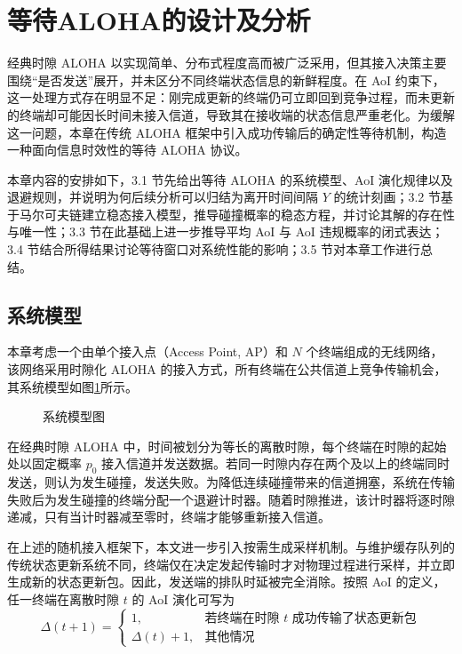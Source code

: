 \clearpage

\vspace*{-1\baselineskip}
\section{等待ALOHA的设计及分析}
\vspace{6pt}

经典时隙 ALOHA 以实现简单、分布式程度高而被广泛采用，但其接入决策主要围绕“是否发送”展开，并未区分不同终端状态信息的新鲜程度。在 AoI 约束下，这一处理方式存在明显不足：刚完成更新的终端仍可立即回到竞争过程，而未更新的终端却可能因长时间未接入信道，导致其在接收端的状态信息严重老化。为缓解这一问题，本章在传统 ALOHA 框架中引入成功传输后的确定性等待机制，构造一种面向信息时效性的等待 ALOHA 协议。

本章内容的安排如下，3.1 节先给出等待 ALOHA 的系统模型、AoI 演化规律以及退避规则，并说明为何后续分析可以归结为离开时间间隔 $Y$ 的统计刻画；3.2 节基于马尔可夫链建立稳态接入模型，推导碰撞概率的稳态方程，并讨论其解的存在性与唯一性；3.3 节在此基础上进一步推导平均 AoI 与 AoI 违规概率的闭式表达；3.4 节结合所得结果讨论等待窗口对系统性能的影响；3.5 节对本章工作进行总结。

\subsection{系统模型}

本章考虑一个由单个接入点（Access Point, AP）和 $N$ 个终端组成的无线网络，该网络采用时隙化 ALOHA 的接入方式，所有终端在公共信道上竞争传输机会，其系统模型如图\ref{fig:cp3_system_model}所示。

\begin{figure}[htbp]
    \centering
    
    \caption{系统模型图}
    \label{fig:cp3_system_model}
\end{figure}

在经典时隙 ALOHA 中，时间被划分为等长的离散时隙，每个终端在时隙的起始处以固定概率 $p_0$ 接入信道并发送数据。若同一时隙内存在两个及以上的终端同时发送，则认为发生碰撞，发送失败。为降低连续碰撞带来的信道拥塞，系统在传输失败后为发生碰撞的终端分配一个退避计时器。随着时隙推进，该计时器将逐时隙递减，只有当计时器减至零时，终端才能够重新接入信道。

在上述的随机接入框架下，本文进一步引入按需生成采样机制。与维护缓存队列的传统状态更新系统不同，终端仅在决定发起传输时才对物理过程进行采样，并立即生成新的状态更新包。因此，发送端的排队时延被完全消除。按照 AoI 的定义，任一终端在离散时隙 $t$ 的 AoI 演化可写为
\begin{equation}
    \label{eq:aoi_evolution}
    \Delta(t+1) =
    \begin{cases}
        1, & \text{若终端在时隙 } t \text{ 成功传输了状态更新包} \\
        \Delta(t) + 1, & \text{其他情况}
    \end{cases}
\end{equation}

